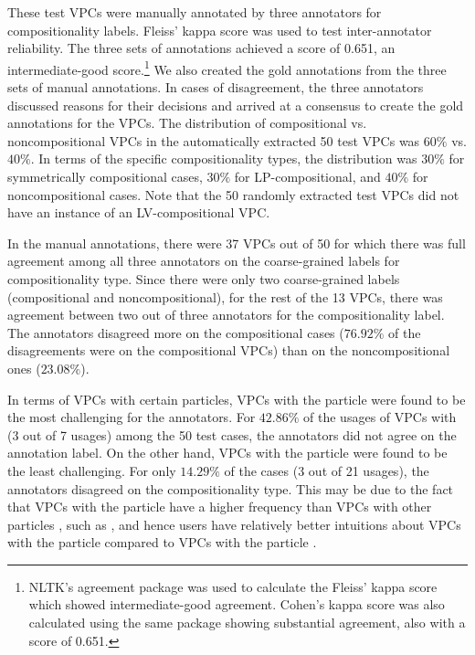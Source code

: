 \documentclass[output=paper
,modfonts
,nonflat]{langsci/langscibook}
\begin{document}
These test VPCs were manually annotated by three annotators for compositionality labels. Fleiss' kappa score \citep{Fle71} was used to test inter-annotator reliability. The three sets of annotations achieved a score of 0.651, an intermediate-good score.\footnote{NLTK's agreement package was used to calculate the Fleiss' kappa score which showed intermediate-good agreement. Cohen's kappa score \citep{Coh60} was also calculated using the same package showing substantial agreement, also with a score of 0.651.} We also created the gold annotations from the three sets of manual annotations. In cases of disagreement, the three annotators discussed reasons for their decisions and arrived at a consensus to create the gold annotations for the VPCs. The distribution of compositional vs. noncompositional VPCs in the automatically extracted 50 test VPCs was $60\%$ vs. $40\%$. In terms of the specific compositionality types, the distribution was $30\%$ for symmetrically compositional cases, $30\%$ for LP-compositional, and $40\%$ for noncompositional cases. Note that the 50 randomly extracted test VPCs did not have an instance of an LV-compositional VPC.

In the manual annotations, there were 37 VPCs out of 50 for which there was full agreement among all three annotators on the coarse-grained labels for compositionality type. Since there were only two coarse-grained labels (compositional and noncompositional), for the rest of the 13 VPCs, there was agreement between two out of three annotators for the compositionality label. The annotators disagreed more on the compositional cases ($76.92\%$ of the disagreements were on the compositional VPCs) than on the noncompositional ones ($23.08\%$).

In terms of VPCs with certain particles, VPCs with the particle  were found to be the most challenging for the annotators. For $42.86\%$ of the usages of VPCs with  (3 out of 7 usages) among the 50 test cases, the annotators did not agree on the annotation label. On the other hand, VPCs with the particle  were found to be the least challenging. For only $14.29\%$ of the cases (3 out of 21 usages), the annotators disagreed on the compositionality type. This may be due to the fact that VPCs with the particle  have a higher frequency than VPCs with other particles \citep{Vil06}, such as , and hence users have relatively better intuitions about VPCs with the particle  compared to VPCs with the particle .
\end{document}
